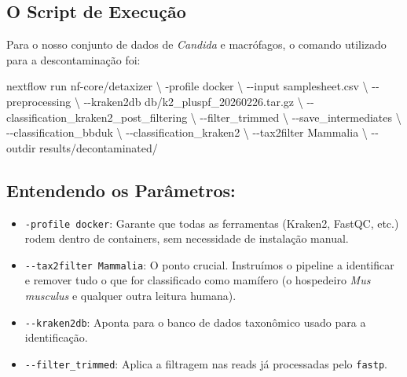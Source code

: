 \documentclass[
  letterpaper,
  DIV=11,
  numbers=noendperiod]{scrreprt}
\newenvironment{Shaded}{\begin{snugshade}}{\end{snugshade}}
\newcommand{\AttributeTok}[1]{\textcolor[rgb]{0.40,0.45,0.13}{#1}}
\newcommand{\DataTypeTok}[1]{\textcolor[rgb]{0.68,0.00,0.00}{#1}}
\newcommand{\ExtensionTok}[1]{\textcolor[rgb]{0.00,0.23,0.31}{#1}}
\newcommand{\NormalTok}[1]{\textcolor[rgb]{0.00,0.23,0.31}{#1}}
\newcommand{\StringTok}[1]{\textcolor[rgb]{0.13,0.47,0.30}{#1}}
\providecommand{\tightlist}{%
  \setlength{\itemsep}{0pt}\setlength{\parskip}{0pt}}
\begin{document}
\subsection{O Script de Execução}\label{o-script-de-execuuxe7uxe3o}

Para o nosso conjunto de dados de \emph{Candida} e macrófagos, o comando
utilizado para a descontaminação foi:

\begin{Shaded}
\begin{Highlighting}[]
\ExtensionTok{nextflow}\NormalTok{ run nf{-}core/detaxizer }\DataTypeTok{\textbackslash{}}
   \AttributeTok{{-}profile}\NormalTok{ docker }\DataTypeTok{\textbackslash{}}
   \AttributeTok{{-}{-}input}\NormalTok{ samplesheet.csv }\DataTypeTok{\textbackslash{}}
   \AttributeTok{{-}{-}preprocessing} \DataTypeTok{\textbackslash{}}
   \AttributeTok{{-}{-}kraken2db}\NormalTok{ db/k2\_pluspf\_20260226.tar.gz }\DataTypeTok{\textbackslash{}}
   \AttributeTok{{-}{-}classification\_kraken2\_post\_filtering} \DataTypeTok{\textbackslash{}}
   \AttributeTok{{-}{-}filter\_trimmed} \DataTypeTok{\textbackslash{}}
   \AttributeTok{{-}{-}save\_intermediates} \DataTypeTok{\textbackslash{}}
   \AttributeTok{{-}{-}classification\_bbduk} \DataTypeTok{\textbackslash{}}
   \AttributeTok{{-}{-}classification\_kraken2} \DataTypeTok{\textbackslash{}}
   \AttributeTok{{-}{-}tax2filter} \StringTok{\textquotesingle{}Mammalia\textquotesingle{}} \DataTypeTok{\textbackslash{}}
   \AttributeTok{{-}{-}outdir}\NormalTok{ results/decontaminated/}
\end{Highlighting}
\end{Shaded}

\subsection{Entendendo os
Parâmetros:}\label{entendendo-os-paruxe2metros}

\begin{itemize}
\tightlist
\item
  \texttt{-profile\ docker}: Garante que todas as ferramentas (Kraken2,
  FastQC, etc.) rodem dentro de containers, sem necessidade de
  instalação manual.
\item
  \texttt{-\/-tax2filter\ \textquotesingle{}Mammalia\textquotesingle{}}:
  O ponto crucial. Instruímos o pipeline a identificar e remover tudo o
  que for classificado como mamífero (o hospedeiro \emph{Mus musculus} e
  qualquer outra leitura humana).
\item
  \texttt{-\/-kraken2db}: Aponta para o banco de dados taxonômico usado
  para a identificação.
\item
  \texttt{-\/-filter\_trimmed}: Aplica a filtragem nas reads já
  processadas pelo \texttt{fastp}.
\end{itemize}
\end{document}

